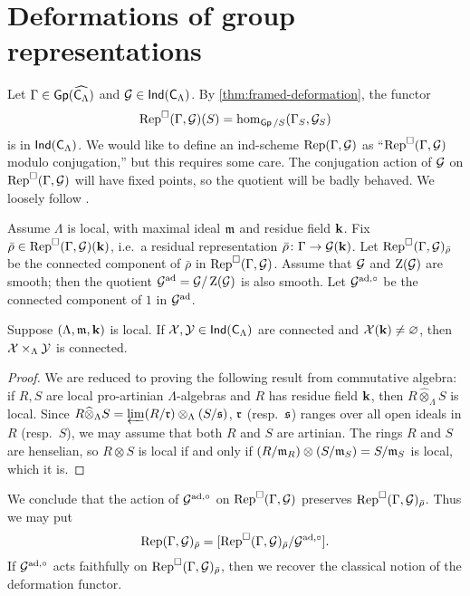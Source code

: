 \documentclass[phd,cornellheadings,draft]{cornell}
\begin{document}
\section{Deformations of group representations}

Let $\Gamma\in \operatorname{\mathsf{Gp}}(\widehat{\mathsf{C}_\Lambda})$ and $\mathcal{G}\in \operatorname{\mathsf{Ind}}(\mathsf{C}_\Lambda)$. By 
\ref{thm:framed-deformation}, the functor 
\[
  \operatorname{Rep}^\square(\Gamma,\mathcal{G})(S) = \hom_{\operatorname{\mathsf{Gp}}/S}(\Gamma_S,\mathcal{G}_S)
\]
is in $\operatorname{\mathsf{Ind}}(\mathsf{C}_\Lambda)$. We would like to define an ind-scheme 
$\operatorname{Rep}(\Gamma,\mathcal{G})$ as ``$\operatorname{Rep}^\square(\Gamma,\mathcal{G})$ modulo conjugation,'' but 
this requires some care. The conjugation action of $\mathcal{G}$ on 
$\operatorname{Rep}^\square(\Gamma,\mathcal{G})$ will have fixed points, so the quotient will be 
badly behaved. We loosely follow \cite{tilouine-1996}. 

Assume $\Lambda$ is local, with maximal ideal $\mathfrak{m}$ and residue field $\mathbf{k}$. 
Fix $\bar\rho\in \operatorname{Rep}^\square(\Gamma,\mathcal{G})(\mathbf{k})$, i.e.~a residual representation 
$\bar\rho\colon \Gamma\to \mathcal{G}(\mathbf{k})$. Let $\operatorname{Rep}^\square(\Gamma,\mathcal{G})_{\bar\rho}$ 
be the connected component of $\bar\rho$ in $\operatorname{Rep}^\square(\Gamma,\mathcal{G})$. Assume 
that $\mathcal{G}$ and $\operatorname{Z}(\mathcal{G})$ are smooth; then the quotient 
$\mathcal{G}^{\mathrm{ad}}=\mathcal{G}/\operatorname{Z}(\mathcal{G})$ is also smooth. Let $\mathcal{G}^{\mathrm{ad},\circ}$ be the 
connected component of $1$ in $\mathcal{G}^{\mathrm{ad}}$. 

\begin{theorem}
Suppose $(\Lambda,\mathfrak{m},\mathbf{k})$ is local. If $\mathcal{X},\mathcal{Y}\in \operatorname{\mathsf{Ind}}(\mathsf{C}_\Lambda)$ are 
connected and $\mathcal{X}(\mathbf{k})\ne\varnothing$, then $\mathcal{X}\times_\Lambda \mathcal{Y}$ is 
connected. 
\end{theorem}
\begin{proof}
We are reduced to proving the following result from commutative algebra: if 
$R,S$ are local pro-artinian $\Lambda$-algebras and $R$ has residue field 
$\mathbf{k}$, then $R\widehat\otimes_\Lambda S$ is local. Since 
$R\widehat\otimes_\Lambda S = \varprojlim (R/\mathfrak{r})\otimes_\Lambda (S/\mathfrak{s})$, 
$\mathfrak{r}$ (resp.~$\mathfrak{s}$) ranges over all open ideals in $R$ (resp.~$S$), we may 
assume that both $R$ and $S$ are artinian. The rings $R$ and $S$ are 
henselian, so $R\otimes S$ is local if and only if 
$(R/\mathfrak{m}_R)\otimes (S/\mathfrak{m}_S) = S/\mathfrak{m}_S$ is local, which it is. 
\end{proof}

We conclude that the action of $\mathcal{G}^{\mathrm{ad},\circ}$ on $\operatorname{Rep}^\square(\Gamma,\mathcal{G})$ 
preserves $\operatorname{Rep}^\square(\Gamma,\mathcal{G})_{\bar\rho}$. Thus we may put 
\[
	\operatorname{Rep}(\Gamma,\mathcal{G})_{\bar\rho} = [\operatorname{Rep}^\square(\Gamma,\mathcal{G})_{\bar\rho} / \mathcal{G}^{\mathrm{ad},\circ}] .
\]
If $\mathcal{G}^{\mathrm{ad},\circ}$ acts faithfully on $\operatorname{Rep}^\square(\Gamma,\mathcal{G})_{\bar\rho}$, 
then we recover the classical notion of the deformation functor. 
\end{document}
